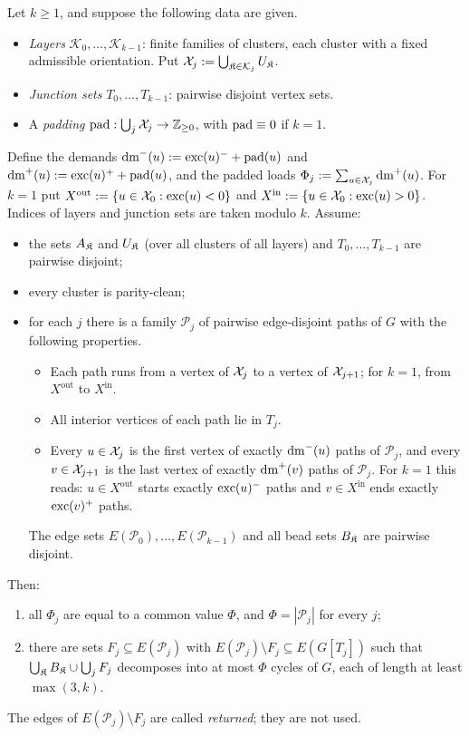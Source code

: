 \begin{lemma}\label{s6:lemHCCP}
Let $k\ge1$, and suppose the following data are given.
\begin{itemize}
\item \emph{Layers} $\mathcal K_0,\dots,\mathcal K_{k-1}$: finite families of clusters, each cluster with a fixed admissible orientation. Put $\mathcal{X}_j:=\bigcup_{\mathfrak{K}\in\mathcal K_j}U_{\mathfrak{K}}$.
\item \emph{Junction sets} $T_0,\dots,T_{k-1}$: pairwise disjoint vertex sets.
\item A \emph{padding} $\mathrm{pad}:\bigcup_j\mathcal{X}_j\to\mathbb Z_{\ge0}$, with $\mathrm{pad}\equiv0$ if $k=1$.
\end{itemize}
Define the demands $\mathrm{dm}^-(u):=\mathrm{exc}(u)^-+\mathrm{pad}(u)$ and $\mathrm{dm}^+(u):=\mathrm{exc}(u)^++\mathrm{pad}(u)$, and the padded loads $\Phi_j:=\sum_{u\in\mathcal{X}_j}\mathrm{dm}^+(u)$. For $k=1$ put $X^{\mathrm{out}}:=\{u\in\mathcal{X}_0:\mathrm{exc}(u)<0\}$ and $X^{\mathrm{in}}:=\{u\in\mathcal{X}_0:\mathrm{exc}(u)>0\}$. Indices of layers and junction sets are taken modulo $k$. Assume:
\begin{itemize}
\item[(D)] the sets $A_{\mathfrak{K}}$ and $U_{\mathfrak{K}}$ (over all clusters of all layers) and $T_0,\dots,T_{k-1}$ are pairwise disjoint;
\item[(P)] every cluster is parity-clean;
\item[(JC-P)] for each $j$ there is a family $\mathcal P_j$ of pairwise edge-disjoint paths of $G$ with the following properties.
  \begin{itemize}
  \item Each path runs from a vertex of $\mathcal{X}_j$ to a vertex of $\mathcal{X}_{j+1}$; for $k=1$, from $X^{\mathrm{out}}$ to $X^{\mathrm{in}}$.
  \item All interior vertices of each path lie in $T_j$.
  \item Every $u\in\mathcal{X}_j$ is the first vertex of exactly $\mathrm{dm}^-(u)$ paths of $\mathcal P_j$, and every $v\in\mathcal{X}_{j+1}$ is the last vertex of exactly $\mathrm{dm}^+(v)$ paths of $\mathcal P_j$. For $k=1$ this reads: $u\in X^{\mathrm{out}}$ starts exactly $\mathrm{exc}(u)^-$ paths and $v\in X^{\mathrm{in}}$ ends exactly $\mathrm{exc}(v)^+$ paths.
  \end{itemize}
  The edge sets $E(\mathcal P_0),\dots,E(\mathcal P_{k-1})$ and all bead sets $B_{\mathfrak{K}}$ are pairwise disjoint.
\end{itemize}
Then:
\begin{enumerate}
\item[(i)] all $\Phi_j$ are equal to a common value $\Phi$, and $\Phi=|\mathcal P_j|$ for every $j$;
\item[(ii)] there are sets $F_j\subseteq E(\mathcal P_j)$ with $E(\mathcal P_j)\setminus F_j\subseteq E(G[T_j])$ such that $\bigcup_{\mathfrak{K}} B_{\mathfrak{K}}\cup\bigcup_jF_j$ decomposes into at most $\Phi$ cycles of $G$, each of length at least $\max(3,k)$.
\end{enumerate}
The edges of $E(\mathcal P_j)\setminus F_j$ are called \emph{returned}; they are not used.
\deps{\ref{s6:lemGATE}, \ref{s6:lemMED}, \ref{s6:defCluster}}
\end{lemma}

